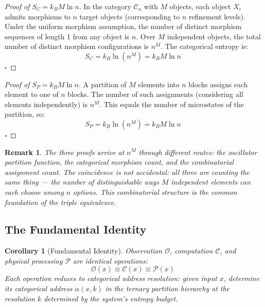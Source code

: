 \documentclass[12pt,twocolumn]{article}
\newtheorem{corollary}[theorem]{Corollary}
\newtheorem{remark}{Remark}[section]
\begin{document}
\begin{proof}[Proof of $S_C = k_B M \ln n$]
In the category $\mathcal{C}_n$ with $M$ objects, each object $X_i$ admits morphisms to $n$ target objects (corresponding to $n$ refinement levels). Under the uniform morphism assumption, the number of distinct morphism sequences of length 1 from any object is $n$. Over $M$ independent objects, the total number of distinct morphism configurations is $n^M$. The categorical entropy is:
\begin{equation}
S_C = k_B \ln(n^M) = k_B M \ln n
\end{equation}
$\square$
\end{proof}

\begin{proof}[Proof of $S_P = k_B M \ln n$]
A partition of $M$ elements into $n$ blocks assigns each element to one of $n$ blocks. The number of such assignments (considering all elements independently) is $n^M$. This equals the number of microstates of the partition, so:
\begin{equation}
S_P = k_B \ln(n^M) = k_B M \ln n
\end{equation}
$\square$
\end{proof}

\begin{remark}
The three proofs arrive at $n^M$ through different routes: the oscillator partition function, the categorical morphism count, and the combinatorial assignment count. The coincidence is not accidental: all three are counting the same thing --- the number of distinguishable ways $M$ independent elements can each choose among $n$ options. This combinatorial structure is the common foundation of the triple equivalence.
\end{remark}

\subsection{The Fundamental Identity}

\begin{corollary}[Fundamental Identity]
\label{cor:fundamental}
Observation $\mathcal{O}$, computation $\mathcal{C}$, and physical processing $\mathcal{P}$ are identical operations:
\begin{equation}
\label{eq:fundamental}
\mathcal{O}(x) \equiv \mathcal{C}(x) \equiv \mathcal{P}(x)
\end{equation}
Each operation reduces to categorical address resolution: given input $x$, determine its categorical address $\alpha(x, k)$ in the ternary partition hierarchy at the resolution $k$ determined by the system's entropy budget.
\end{corollary}
\end{document}
